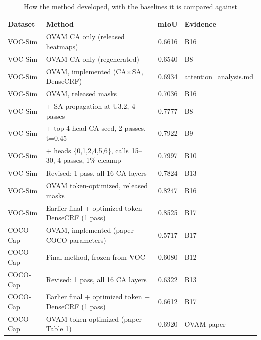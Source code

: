 \begin{table}[H]\centering\scriptsize\setlength{\tabcolsep}{3pt}
\begin{tabular}{>{\raggedright\arraybackslash}p{1.92cm}>{\raggedright\arraybackslash}p{7.65cm}r>{\raggedright\arraybackslash}p{3.85cm}}
\toprule
Dataset & Method & mIoU & Evidence \\
\midrule
VOC-Sim & OVAM CA only (released heatmaps) & 0.6616 & B16 \\
VOC-Sim & OVAM CA only (regenerated) & 0.6540 & B8 \\
VOC-Sim & OVAM, implemented (CA$\times$SA, DenseCRF) & 0.6934 & attention\_\allowbreak{}analysis.md \\
VOC-Sim & OVAM, released masks & 0.7036 & B16 \\
VOC-Sim & + SA propagation at U3.2, 4 passes & 0.7777 & B8 \\
VOC-Sim & + top-4-head CA seed, 2 passes, t=0.45 & 0.7922 & B9 \\
VOC-Sim & + heads \{0,1,2,4,5,6\}, calls 15--30, 4 passes, 1\% cleanup & 0.7997 & B10 \\
VOC-Sim & Revised: 1 pass, all 16 CA layers & 0.7824 & B13 \\
VOC-Sim & OVAM token-optimized, released masks & 0.8247 & B16 \\
VOC-Sim & Earlier final + optimized token + DenseCRF (1 pass) & 0.8525 & B17 \\
COCO-Cap & OVAM, implemented (paper COCO parameters) & 0.5717 & B17 \\
COCO-Cap & Final method, frozen from VOC & 0.6080 & B12 \\
COCO-Cap & Revised: 1 pass, all 16 CA layers & 0.6322 & B13 \\
COCO-Cap & Earlier final + optimized token + DenseCRF (1 pass) & 0.6612 & B17 \\
COCO-Cap & OVAM token-optimized (paper Table 1) & 0.6920 & OVAM paper \\
\bottomrule
\end{tabular}
\caption{How the method developed, with the baselines it is compared against}\label{tab:b_progression}
\end{table}
